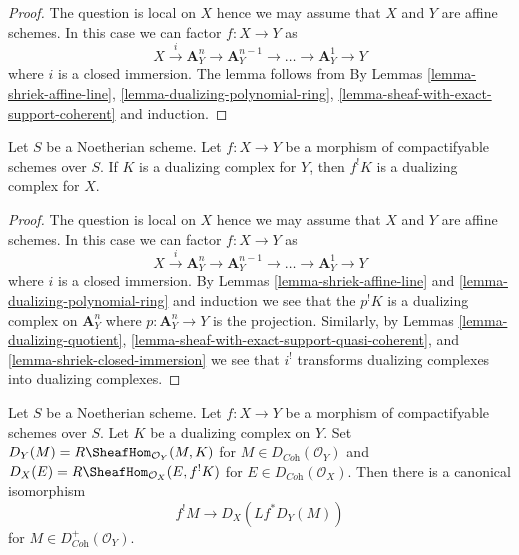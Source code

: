 \begin{proof}
The question is local on $X$ hence we may assume that $X$ and $Y$ are
affine schemes. In this case we can factor $f : X \to Y$ as
$$
X \xrightarrow{i} \mathbf{A}^n_Y \to \mathbf{A}^{n - 1}_Y \to \ldots \to
\mathbf{A}^1_Y \to Y
$$
where $i$ is a closed immersion. The lemma follows from
By Lemmas \ref{lemma-shriek-affine-line},
\ref{lemma-dualizing-polynomial-ring},
\ref{lemma-sheaf-with-exact-support-coherent} and induction.
\end{proof}

\begin{lemma}
\label{lemma-shriek-dualizing}
Let $S$ be a Noetherian scheme. Let $f : X \to Y$ be a morphism
of compactifyable schemes over $S$. If $K$ is a dualizing complex
for $Y$, then $f^!K$ is a dualizing complex for $X$.
\end{lemma}

\begin{proof}
The question is local on $X$ hence we may assume that $X$ and $Y$ are
affine schemes. In this case we can factor $f : X \to Y$ as
$$
X \xrightarrow{i} \mathbf{A}^n_Y \to \mathbf{A}^{n - 1}_Y \to \ldots \to
\mathbf{A}^1_Y \to Y
$$
where $i$ is a closed immersion. By Lemmas \ref{lemma-shriek-affine-line} and
\ref{lemma-dualizing-polynomial-ring} and induction we see that
the $p^!K$ is a dualizing complex on $\mathbf{A}^n_Y$ where
$p : \mathbf{A}^n_Y \to Y$ is the projection. Similarly, by
Lemmas \ref{lemma-dualizing-quotient},
\ref{lemma-sheaf-with-exact-support-quasi-coherent}, and
\ref{lemma-shriek-closed-immersion} we see that $i^!$
transforms dualizing complexes into dualizing complexes.
\end{proof}

\begin{lemma}
\label{lemma-shriek-via-duality}
Let $S$ be a Noetherian scheme. Let $f : X \to Y$ be a morphism
of compactifyable schemes over $S$. Let $K$ be a dualizing complex
on $Y$. Set $D_Y(M) = R\SheafHom_{\mathcal{O}_Y}(M, K)$ for
$M \in D_{\textit{Coh}}(\mathcal{O}_Y)$ and
$D_X(E) = R\SheafHom_{\mathcal{O}_X}(E, f^!K)$ for
$E \in D_{\textit{Coh}}(\mathcal{O}_X)$. Then there is a canonical
isomorphism
$$
f^!M \longrightarrow D_X(Lf^*D_Y(M))
$$
for $M \in D_{\textit{Coh}}^+(\mathcal{O}_Y)$.
\end{lemma}

